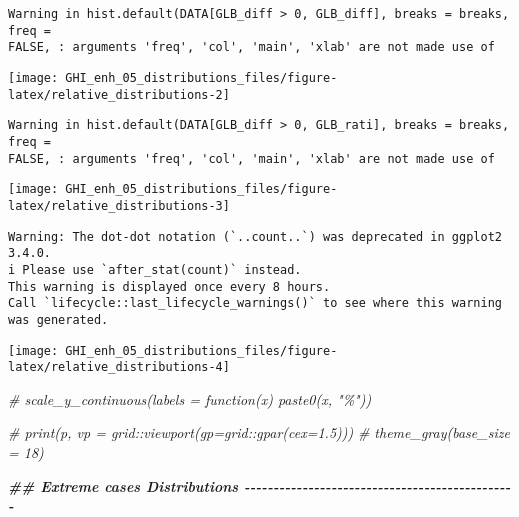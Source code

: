 \documentclass[
  10pt,
  a4paper,oneside]{article}
\newenvironment{Shaded}{\begin{snugshade}}{\end{snugshade}}
\newcommand{\CommentTok}[1]{\textcolor[rgb]{0.56,0.35,0.01}{\textit{#1}}}
\newcommand{\DocumentationTok}[1]{\textcolor[rgb]{0.56,0.35,0.01}{\textbf{\textit{#1}}}}
\begin{document}
\begin{verbatim}
Warning in hist.default(DATA[GLB_diff > 0, GLB_diff], breaks = breaks, freq =
FALSE, : arguments 'freq', 'col', 'main', 'xlab' are not made use of
\end{verbatim}

\begin{center}\texttt{[image: GHI\_enh\_05\_distributions\_files/figure-latex/relative\_distributions-2]} \end{center}

\begin{verbatim}
Warning in hist.default(DATA[GLB_diff > 0, GLB_rati], breaks = breaks, freq =
FALSE, : arguments 'freq', 'col', 'main', 'xlab' are not made use of
\end{verbatim}

\begin{center}\texttt{[image: GHI\_enh\_05\_distributions\_files/figure-latex/relative\_distributions-3]} \end{center}

\begin{verbatim}
Warning: The dot-dot notation (`..count..`) was deprecated in ggplot2 3.4.0.
i Please use `after_stat(count)` instead.
This warning is displayed once every 8 hours.
Call `lifecycle::last_lifecycle_warnings()` to see where this warning was generated.
\end{verbatim}

\begin{center}\texttt{[image: GHI\_enh\_05\_distributions\_files/figure-latex/relative\_distributions-4]} \end{center}

\begin{Shaded}
\begin{Highlighting}[]
  \CommentTok{\# scale\_y\_continuous(labels = function(x) paste0(x, "\%"))}

\CommentTok{\# print(p, vp = grid::viewport(gp=grid::gpar(cex=1.5)))}
\CommentTok{\# theme\_gray(base\_size = 18)}



\DocumentationTok{\#\#  Extreme cases Distributions  {-}{-}{-}{-}{-}{-}{-}{-}{-}{-}{-}{-}{-}{-}{-}{-}{-}{-}{-}{-}{-}{-}{-}{-}{-}{-}{-}{-}{-}{-}{-}{-}{-}{-}{-}{-}{-}{-}{-}{-}{-}{-}{-}{-}{-}{-}{-}}
\end{Highlighting}
\end{Shaded}

\FloatBarrier
\end{document}
